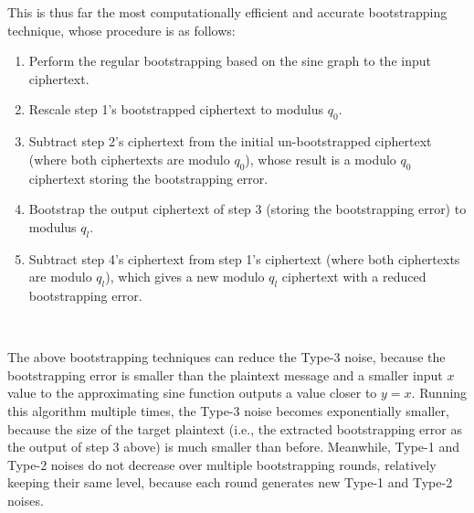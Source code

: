  This is thus far the most computationally efficient and accurate bootstrapping technique, whose procedure is as follows:
\begin{enumerate}
\item Perform the regular bootstrapping based on the sine graph to the input ciphertext.
\item Rescale step 1's bootstrapped ciphertext to modulus $q_0$.
\item Subtract step 2's ciphertext from the initial un-bootstrapped ciphertext (where both ciphertexts are modulo $q_0$), whose result is a modulo $q_0$ ciphertext storing the bootstrapping error.
\item Bootstrap the output ciphertext of step 3 (storing the bootstrapping error) to modulus $q_l$.
\item Subtract step 4's ciphertext from step 1's ciphertext (where both ciphertexts are modulo $q_l$), which gives a new modulo $q_l$ ciphertext with a reduced bootstrapping error.
\end{enumerate}

$ $

 The above bootstrapping techniques can reduce the Type-3 noise, because the bootstrapping error is smaller than the plaintext message and a smaller input $x$ value to the approximating sine function outputs a value closer to $y=x$. Running this algorithm multiple times, the Type-3 noise becomes exponentially smaller, because the size of the target plaintext (i.e., the extracted bootstrapping error as the output of step 3 above) is much smaller than before. Meanwhile, Type-1 and Type-2 noises do not decrease over multiple bootstrapping rounds, relatively keeping  their same level, because each round generates new Type-1 and Type-2 noises. 



